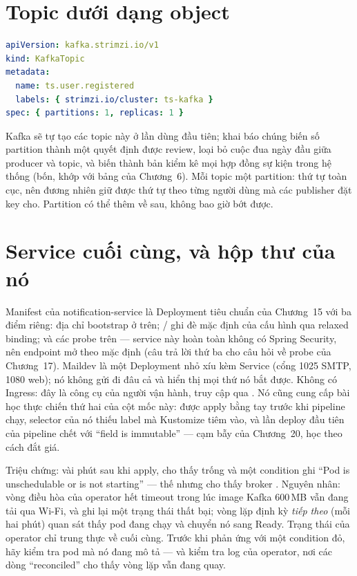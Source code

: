 \section{Topic dưới dạng object}

\begin{lstlisting}[language=yaml]
apiVersion: kafka.strimzi.io/v1
kind: KafkaTopic
metadata:
  name: ts.user.registered
  labels: { strimzi.io/cluster: ts-kafka }
spec: { partitions: 1, replicas: 1 }
\end{lstlisting}

Kafka sẽ tự tạo các topic này ở lần dùng đầu tiên; khai báo chúng
biến số partition thành một quyết định được review, loại bỏ cuộc đua
ngày đầu giữa producer và topic, và biến 
thành bản kiểm kê mọi hợp đồng sự kiện trong hệ thống (bốn, khớp với
bảng của Chương~6). Mỗi topic một partition: thứ tự toàn cục, nên
đương nhiên giữ được thứ tự theo từng người dùng mà các publisher
đặt key cho. Partition có thể thêm về sau, không bao giờ bớt được.

\section{Service cuối cùng, và hộp thư của nó}

Manifest của notification-service là Deployment tiêu chuẩn của
Chương~15 với ba điểm riêng: địa chỉ bootstrap ở trên;
 /  ghi đè mặc định
 của cấu hình qua relaxed binding;
và các probe trên  --- service này hoàn toàn
không có Spring Security, nên endpoint mở theo mặc định (câu trả lời
thứ ba cho câu hỏi về probe của Chương~17). Maildev là một Deployment
nhỏ xíu kèm Service (cổng 1025 SMTP, 1080 web); nó không gửi đi đâu
cả và hiển thị mọi thứ nó bắt được. Không có Ingress: đây là công cụ
của người vận hành, truy cập qua . Nó cũng cung
cấp bài học thực chiến thứ hai của cột mốc này: được apply bằng tay
trước khi pipeline chạy, selector của nó thiếu label mà Kustomize
tiêm vào, và lần deploy đầu tiên của pipeline chết với ``field is
immutable'' --- cạm bẫy của Chương~20, học theo cách đắt giá.

\begin{pitfall}
Triệu chứng: vài phút sau khi apply,  cho thấy
 trống và một condition ghi ``Pod is unschedulable or is
not starting'' --- thế nhưng  cho thấy broker
. Nguyên nhân: vòng điều hòa của operator hết
timeout trong lúc image Kafka 600\,MB vẫn đang tải qua Wi-Fi, và ghi
lại một trạng thái thất bại; vòng lặp định kỳ \emph{tiếp theo} (mỗi
hai phút) quan sát thấy pod đang chạy và chuyển nó sang Ready. Trạng
thái của operator chỉ trung thực về cuối cùng. Trước khi phản ứng với
một condition đỏ, hãy kiểm tra pod mà nó đang mô tả --- và kiểm tra
log của operator, nơi các dòng ``reconciled'' cho thấy vòng lặp vẫn
đang quay.
\end{pitfall}

